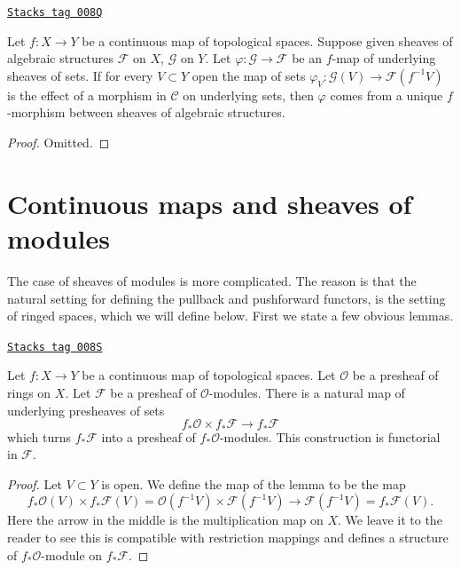 \begin{lemma}
\label{sheaves-lemma-f-map-sets-algebraic-structures}
\href{https://stacks.math.columbia.edu/tag/008Q}{\texttt{Stacks tag 008Q}}

Let $f : X \to Y$ be a continuous map of topological spaces.
Suppose given sheaves of algebraic structures
$\mathcal{F}$ on $X$, $\mathcal{G}$ on $Y$. Let
$\varphi : \mathcal{G} \to \mathcal{F}$ be an $f$-map
of underlying sheaves of sets. If for every $V \subset Y$ open the
map of sets $\varphi_V : \mathcal{G}(V) \to \mathcal{F}(f^{-1}V)$
is the effect of a morphism in $\mathcal{C}$ on underlying sets,
then $\varphi$ comes from a unique $f$-morphism between
sheaves of algebraic structures.
\end{lemma}

\begin{proof}
Omitted.
\end{proof}

\section{Continuous maps and sheaves of modules}
\label{sheaves-section-presheaves-modules-functorial}
The case of sheaves of modules is more complicated.
The reason is that the natural setting for defining
the pullback and pushforward functors, is the setting
of ringed spaces, which we will define below. First
we state a few obvious lemmas.

\begin{lemma}
\label{sheaves-lemma-pushforward-presheaf-module}
\href{https://stacks.math.columbia.edu/tag/008S}{\texttt{Stacks tag 008S}}

Let $f : X \to Y$ be a continuous map of topological spaces.
Let $\mathcal{O}$ be a presheaf of rings on $X$. Let
$\mathcal{F}$ be a presheaf of $\mathcal{O}$-modules.
There is a natural map of underlying presheaves of sets
$$
f_*\mathcal{O} \times f_*\mathcal{F}
\longrightarrow
f_*\mathcal{F}
$$
which turns $f_*\mathcal{F}$ into a presheaf of
$f_*\mathcal{O}$-modules. This construction is
functorial in $\mathcal{F}$.
\end{lemma}

\begin{proof}
Let $V \subset Y$ is open. We define the map of the lemma
to be the map
$$
f_*\mathcal{O}(V) \times f_*\mathcal{F}(V)
=
\mathcal{O}(f^{-1}V) \times \mathcal{F}(f^{-1}V)
\to
\mathcal{F}(f^{-1}V)
=
f_*\mathcal{F}(V).
$$
Here the arrow in the middle is the multiplication map on $X$.
We leave it to the reader to see this is compatible with
restriction mappings and defines a structure of
$f_*\mathcal{O}$-module on $f_*\mathcal{F}$.
\end{proof}

